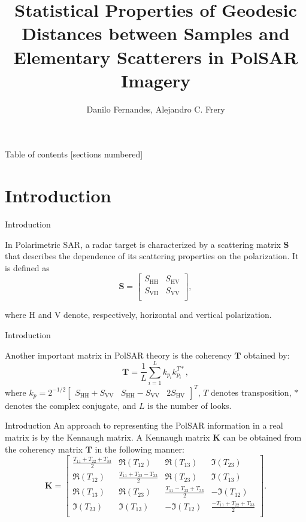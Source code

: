 \documentclass[10pt]{beamer}
\title{Statistical Properties of Geodesic Distances between Samples and Elementary Scatterers in PolSAR Imagery}
\date{}
\author{Danilo Fernandes, Alejandro C. Frery}
\institute{Laboratório de Computação Científica e Análise Numérica\\ Universidade Federal de Alagoas}
\begin{document}
\maketitle

\begin{frame}{Table of contents}
  [sections numbered]
  \tableofcontents%
\end{frame}

\section[Intro]{Introduction}

\begin{frame}[fragile]{Introduction}

    In Polarimetric SAR, a radar target is characterized by a scattering matrix $\bm S$ that describes the dependence of its scattering properties on the polarization. 
    It is defined as
    \[\mathbf{S} = 
    \begin{bmatrix}
    S_{\text{HH}} & S_{\text{HV}}\\
    S_{\text{VH}} & S_{\text{VV}}\\
    \end{bmatrix}
    ,\]
    
    where $\text{H}$ and $\text{V}$ denote, respectively, horizontal and vertical polarization.
  
\end{frame}

\begin{frame}[fragile]{Introduction}

    Another important matrix in PolSAR theory is the coherency $\bm{T}$ obtained by:
    $$
    \mathbf{T} = \frac{1}{L}\sum_{i=1}^{L}k_{p_i}k_{p_i}^{T*},
    $$
    where $k_p = 2^{-1/2} 
    \begin{bmatrix}
    S_{\text{HH}} + S_{\text{VV}} &S_{\text{HH}} - S_{\text{VV}} &2S_{\text{HV}}
    \end{bmatrix}^T
    $, $T$ denotes transposition,  $*$ denotes the complex conjugate, and $L$ is the number of looks.

\end{frame}

\begin{frame}[fragile]{Introduction}
  An approach to representing the PolSAR information in a real matrix is by the Kennaugh matrix. A Kennaugh matrix $\mathbf{K}$ can be obtained from the coherency matrix $\mathbf{T}$ in the following manner:
\[\mathbf{K} = 
\begin{bmatrix}
\frac{ T_{11} + T_{22} + T_{33} }{2} & \Re(T_{12}) & \Re(T_{13}) & \Im(T_{23})\\
\Re(T_{12}) & \frac{T_{11} + T_{22} - T_{33}}{2} & \Re(T_{23}) & \Im(T_{13})\\
\Re(T_{13}) & \Re(T_{23}) & \frac{ T_{11} - T_{22} + T_{33} }{2} & -\Im(T_{12})\\
\Im(T_{23}) & \Im(T_{13}) & -\Im(T_{12}) & \frac{ -T_{11} + T_{22} + T_{33} }{2}\\
\end{bmatrix}
.\]
\end{frame}
\end{document}
